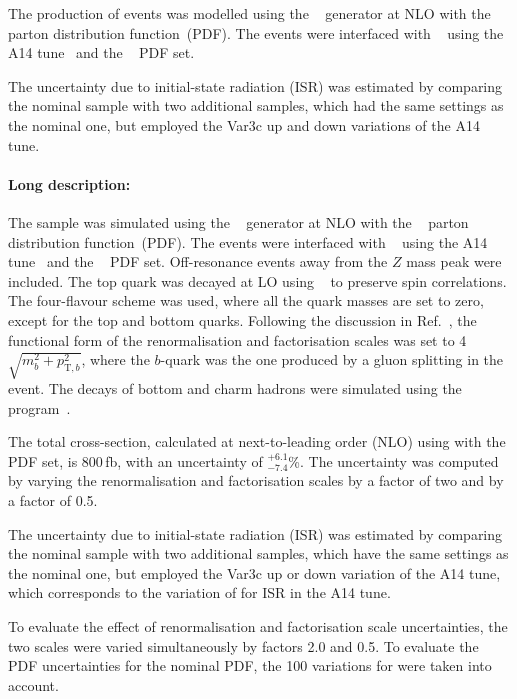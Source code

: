 The production of \tZq events was modelled using the \MGNLO[2.3.3]~\cite{Alwall:2014hca}
generator at NLO with the \NNPDF[3.0nlo]~\cite{Ball:2014uwa} parton distribution function~(PDF).
The events were interfaced with \PYTHIA[8.230]~\cite{Sjostrand:2014zea} using the A14 tune~\cite{ATL-PHYS-PUB-2014-021} and the
\NNPDF[2.3lo]~\cite{Ball:2014uwa} PDF set.

The uncertainty due to initial-state radiation (ISR) was estimated by comparing the nominal \tZq sample with two additional samples,
which had the same settings as the nominal one, but employed the Var3c up and down variations of the A14 tune. 


\paragraph{Long description:}

The \tZq sample was simulated using the \MGNLO[2.3.3]~\cite{Alwall:2014hca}
generator at NLO with the \NNPDF[3.0nlo]~\cite{Ball:2014uwa} parton distribution function~(PDF). The events were interfaced with
\PYTHIA[8.230]~\cite{Sjostrand:2014zea} using the A14 tune~\cite{ATL-PHYS-PUB-2014-021} 
and the \NNPDF[2.3lo]~\cite{Ball:2014uwa} PDF set. Off-resonance events away from the $Z$ mass peak were included. 
The top quark was decayed at LO using \MADSPIN~\cite{Frixione:2007zp,Artoisenet:2012st} to preserve spin correlations.
The four-flavour scheme was used, where all the quark masses are set to zero, except for the top and bottom quarks. 
Following the discussion in Ref.~\cite{Frederix:2012dh}, the functional form of the renormalisation and factorisation scales 
was set to 4$\sqrt{m_b^2+p_{\text{T},b}^2}$, where the $b$-quark was the one produced by a gluon splitting in the event. 
The decays of bottom and charm hadrons were simulated using the \EVTGEN program~\cite{Lange:2001uf}.

The \tZq total cross-section, calculated at next-to-leading order (NLO) using \MGNLO[2.3.3] with the \NNPDF[3.0nlo] PDF set, 
is 800\,fb, with an uncertainty of $^{+6.1}_{-7.4}$\%. The uncertainty was computed by varying the renormalisation and 
factorisation scales by a factor of two and by a factor of 0.5.

The uncertainty due to initial-state radiation (ISR) was estimated by comparing the nominal \tZq sample with two additional samples,
which have the same settings as the nominal one, but employed the Var3c up or down variation of the A14 tune, which
corresponds to the variation of \alphas for ISR in the A14 tune.

To evaluate the effect of renormalisation and factorisation scale uncertainties, the two scales were varied simultaneously by factors 2.0 and 0.5.
To evaluate the PDF uncertainties for the nominal PDF, the 100 variations for \NNPDF[2.3lo] were taken into account. 
